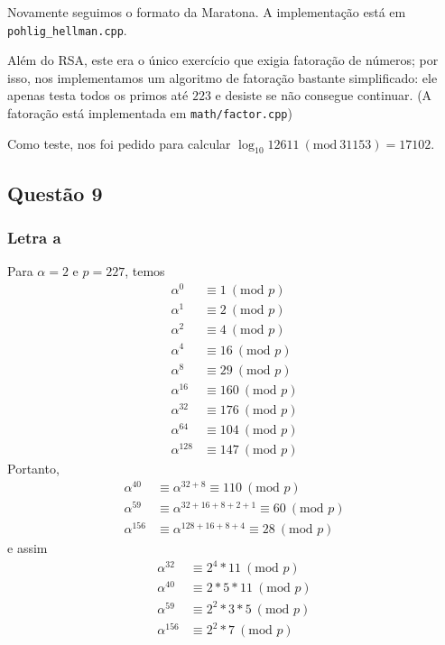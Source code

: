 \documentclass{article}
\renewcommand{\mod}[1]{ \ (\textrm{mod } #1) }
\begin{document}
Novamente seguimos o formato da Maratona.
A implementação está em \verb"pohlig_hellman.cpp".

Além do RSA, este era o único exercício que exigia fatoração de números;
por isso, nos implementamos um algoritmo de fatoração bastante simplificado:
ele apenas testa todos os primos até $223$ e desiste se não consegue continuar.
(A fatoração está implementada em \verb"math/factor.cpp")

Como teste, nos foi pedido para calcular $\log_{10} 12611\ (\mathrm{mod}\ 31153) = 17102$.

\subsection{Questão 9}

\subsubsection{Letra a}

Para $\alpha = 2$ e $p = 227$, temos
\begin{align*}
    \alpha^0 &\equiv 1 \mod{p} \\
    \alpha^1 &\equiv 2 \mod{p} \\
    \alpha^2 &\equiv 4 \mod{p} \\
    \alpha^4 &\equiv 16 \mod{p} \\
    \alpha^8 &\equiv 29 \mod{p} \\
    \alpha^{16} &\equiv 160 \mod{p} \\
    \alpha^{32} &\equiv 176 \mod{p} \\
    \alpha^{64} &\equiv 104 \mod{p} \\
    \alpha^{128} &\equiv 147 \mod{p}
\end{align*}
Portanto,
\begin{align*}
    \alpha^{40} &\equiv \alpha^{32 + 8} \equiv 110 \mod{p} \\
    \alpha^{59} &\equiv \alpha^{32 + 16 + 8 + 2 + 1} \equiv 60 \mod{p} \\
    \alpha^{156} &\equiv \alpha^{128 + 16 + 8 + 4} \equiv 28 \mod{p}
\end{align*}
e assim
\begin{align*}
    \alpha^{32} &\equiv 2^4 * 11 \mod{p} \\
    \alpha^{40} &\equiv 2*5*11 \mod{p} \\
    \alpha^{59} &\equiv 2^2*3*5 \mod{p} \\
    \alpha^{156} &\equiv 2^2*7 \mod{p}
\end{align*}
\end{document}
